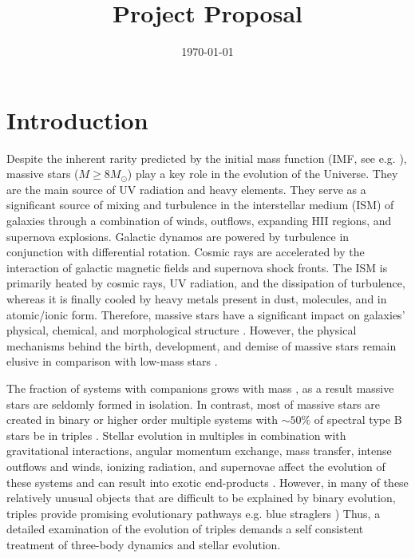 \documentclass{uva-inf-article}
\title{Project Proposal}
\date{\today}
\numberwithin{equation}{section}
\begin{document}
\maketitle
\section{Introduction}

Despite the inherent rarity predicted by the initial mass function (IMF, see e.g. \cite{chabrier2005initial, dib2018emergence}), massive stars ($M \geq 8M_{\odot}$) play a key role in the evolution of the Universe. They are the main source of UV radiation and heavy elements. They serve as a significant source of mixing and turbulence in the interstellar medium (ISM) of galaxies through a combination of winds, outflows, expanding HII regions, and supernova explosions. Galactic dynamos are powered by turbulence in conjunction with differential rotation. Cosmic rays are accelerated by the interaction of galactic magnetic fields and supernova shock fronts. The ISM is primarily heated by cosmic rays, UV radiation, and the dissipation of turbulence, whereas it is finally cooled by heavy metals present in dust, molecules, and in atomic/ionic form. Therefore, massive stars have a significant impact on galaxies' physical, chemical, and morphological structure \citep{kennicutt2005role}. However, the physical mechanisms behind the birth, development, and demise of massive stars remain elusive in comparison with low-mass stars \citep{zinnecker2007toward}. 

The fraction of systems with companions grows with mass \citep{moe2017mind}, as a result massive stars are seldomly formed in isolation. In contrast, most of massive stars are created in binary or higher order multiple systems with $\sim 50\%$ of spectral type B stars be in triples \citep{moe2017mind}. Stellar evolution in multiples in combination with gravitational interactions, angular momentum exchange, mass transfer, intense outflows and winds, ionizing radiation, and supernovae affect the evolution of these systems and can result into exotic end-products \citep{sana2012binary, toonen2016evolution}. However, in many of these relatively unusual objects that are difficult to be explained by binary evolution, triples provide promising evolutionary pathways e.g. blue straglers \citet{winn2009spin}) Thus, a detailed examination of the evolution of triples demands a self consistent treatment of three-body dynamics and stellar evolution. 
\end{document}
